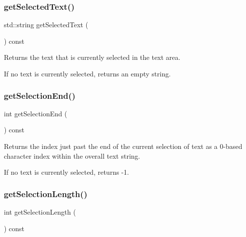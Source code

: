 \subsubsection{\texorpdfstring{get\+Selected\+Text()}{getSelectedText()}}
{\footnotesize\ttfamily std\+::string get\+Selected\+Text (\begin{DoxyParamCaption}{ }\end{DoxyParamCaption}) const\hspace{0.3cm}{\ttfamily [virtual]}}



Returns the text that is currently selected in the text area. 

If no text is currently selected, returns an empty string. \mbox{\label{classGTextArea_a2885313daa0e367cee2ccd0c704a6147}} 
\subsubsection{\texorpdfstring{get\+Selection\+End()}{getSelectionEnd()}}
{\footnotesize\ttfamily int get\+Selection\+End (\begin{DoxyParamCaption}{ }\end{DoxyParamCaption}) const\hspace{0.3cm}{\ttfamily [virtual]}}



Returns the index just past the end of the current selection of text as a 0-\/based character index within the overall text string. 

If no text is currently selected, returns -\/1. \mbox{\label{classGTextArea_a68f7816694269b73e6284e756eb0c179}} 
\subsubsection{\texorpdfstring{get\+Selection\+Length()}{getSelectionLength()}}
{\footnotesize\ttfamily int get\+Selection\+Length (\begin{DoxyParamCaption}{ }\end{DoxyParamCaption}) const\hspace{0.3cm}{\ttfamily [virtual]}}



